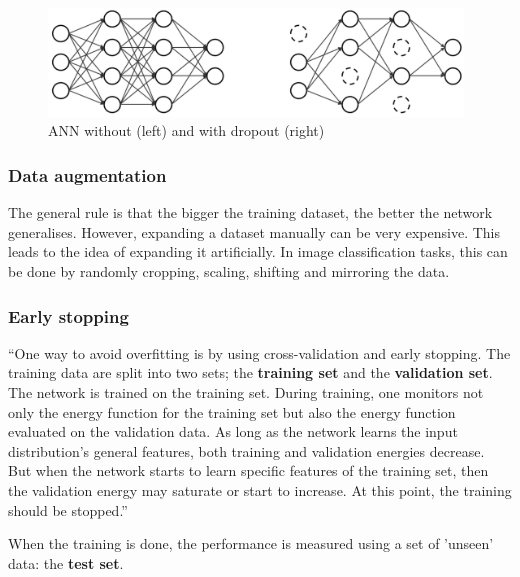 \vspace{4mm}
\begin{figure}[htb]
	\begin{center}
		\includegraphics*[width=11cm, keepaspectratio]{obr/dropou.png}
	\end{center}
	\vspace{4mm}
	\caption{ANN without (left) and with dropout (right) \cite{arvi}} 
	\label{dropout}
\end{figure}

\subsubsection{Data augmentation}

The general rule is that the bigger the training dataset, the better the network generalises. However, expanding a dataset manually can be very expensive. This leads to the idea of expanding it artificially. In image classification tasks, this can be done by randomly cropping, scaling, shifting and mirroring the data. \cite{mehlig}

\subsubsection{Early stopping}
\enquote{One way to avoid overfitting is by using cross-validation and early stopping. The training data are split into two sets; the \textbf{training set} and the \textbf{validation set}. The network is trained on the training set. During training, one monitors not only the energy function for the training set but also the energy function evaluated on the validation data. As long as the network learns the input distribution's general features, both training and validation energies decrease. But when the network starts to learn specific features of the training set, then the validation energy may saturate or start to increase. At this point, the training should be stopped.} \cite{mehlig}

When the training is done, the performance is measured using a set of 'unseen' data: the \textbf{test set}. \cite{mehlig}

